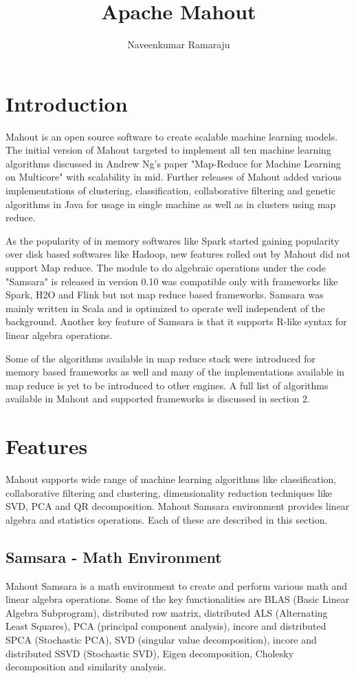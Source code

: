 \documentclass[9pt,twocolumn,twoside]{../../styles/osajnl}
\title{Apache Mahout}
\author[1,*]{Naveenkumar Ramaraju}
\affil[1]{School of Informatics and Computing, Bloomington, IN 47408, U.S.A.}
\affil[*]{Corresponding authors:naveenkumar2703@gmail.com}
\begin{document}
\maketitle

\section{Introduction}
Mahout is an open source software to create scalable machine learning
models. The initial version of Mahout targeted to implement all ten
machine learning algorithms discussed in Andrew Ng's paper "Map-Reduce
for Machine Learning on Multicore"\cite{paper-NIPS2006_3150} with
scalability in mid. Further releases of Mahout added various
implementations of clustering, classification, collaborative filtering
and genetic algorithms in Java for usage in single machine as well as
in clusters using map reduce.

As the popularity of in memory softwares like Spark started gaining
popularity over disk based softwares like Hadoop, new features rolled
out by Mahout did not support Map reduce. The module to do algebraic
operations under the code "Samsara" is released in version 0.10 was
compatible only with frameworks like Spark, H2O and Flink but not map
reduce based frameworks. Samsara was mainly written in Scala and is
optimized to operate well independent of the background. Another key
feature of Samsara is that it supports R-like syntax for linear
algebra operations.

Some of the algorithms available in map reduce stack were introduced
for memory based frameworks as well and many of the implementations
available in map reduce is yet to be introduced to other engines. A
full list of algorithms available in Mahout and supported frameworks
is discussed in section 2.


\section{Features}
Mahout supports wide range of machine learning algorithms like
classification, collaborative filtering and clustering, dimensionality
reduction techniques like SVD, PCA and QR decomposition. Mahout
Samsara environment provides linear algebra and statistics
operations. Each of these are described in this section.

\subsection{Samsara - Math Environment}
Mahout Samsara\cite{www-samsara} is a math environment to create and
perform various math and linear algebra operations. Some of the key
functionalities are BLAS (Basic Linear Algebra Subprogram),
distributed row matrix, distributed ALS (Alternating Least Squares),
PCA (principal component analysis), incore and distributed SPCA
(Stochastic PCA), SVD (singular value decomposition), incore and
distributed SSVD (Stochastic SVD), Eigen decomposition, Cholesky
decomposition and similarity analysis.
\end{document}
